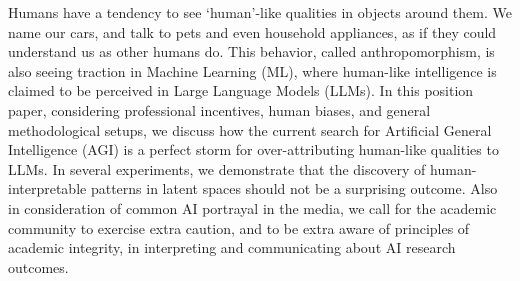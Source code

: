 Humans have a tendency to see `human'-like qualities in objects around them. We name our cars, and talk to pets and even household appliances, as if they could understand us as other humans do. This behavior, called anthropomorphism, is also seeing traction in Machine Learning (ML), where human-like intelligence is claimed to be perceived in Large Language Models (LLMs). 
In this position paper, considering professional incentives, human biases, and general methodological setups, we discuss how the current search for Artificial General Intelligence (AGI) is a perfect storm for over-attributing human-like qualities to LLMs. In several experiments, we demonstrate that the discovery of human-interpretable patterns in latent spaces should not be a surprising outcome. Also in consideration of common AI portrayal in the media, we call for the academic community to exercise extra caution, and to be extra aware of principles of academic integrity, in interpreting and communicating about AI research outcomes.